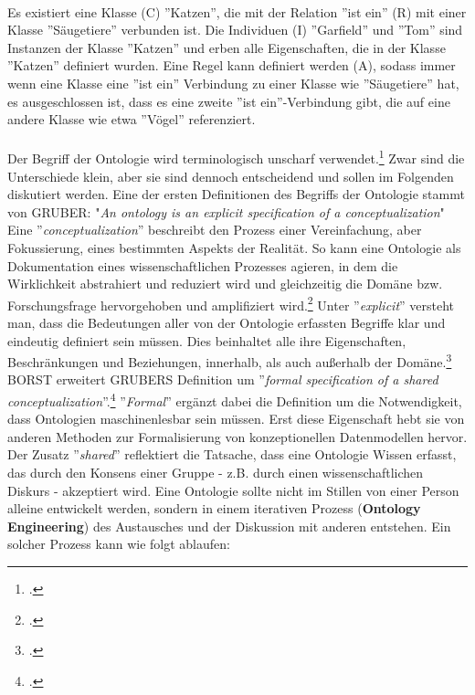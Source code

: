 \documentclass[12pt,a4paper]{article}
\begin{document}
\\
Es existiert eine Klasse (C) ''Katzen'', die mit der Relation ''ist ein'' (R) mit einer Klasse ''Säugetiere'' verbunden ist.  Die Individuen (I) ''Garfield'' und ''Tom'' sind Instanzen der Klasse ''Katzen'' und erben alle Eigenschaften, die in der Klasse ''Katzen'' definiert wurden. Eine Regel kann definiert werden (A), sodass immer wenn eine Klasse eine ''ist ein'' Verbindung zu einer Klasse wie ''Säugetiere'' hat, es ausgeschlossen ist, dass es eine zweite ''ist ein''-Verbindung  gibt, die auf eine andere Klasse wie etwa ''Vögel'' referenziert. 
\\
\\
Der Begriff der Ontologie wird terminologisch unscharf verwendet.\footcite[][S.1]{gruber1993translation} Zwar sind die Unterschiede klein, aber sie sind dennoch entscheidend und sollen im Folgenden diskutiert werden.
Eine der ersten Definitionen des Begriffs der Ontologie stammt von GRUBER: "\textit{An ontology is an explicit specification of a conceptualization}"
\\
Eine ''\textit{conceptualization}'' beschreibt den Prozess einer Vereinfachung, aber Fokussierung, eines bestimmten Aspekts der Realität. So kann eine Ontologie als Dokumentation eines wissenschaftlichen 
Prozesses agieren, in dem die Wirklichkeit abstrahiert und reduziert wird und gleichzeitig die Domäne bzw. Forschungsfrage hervorgehoben und amplifiziert wird.\footcite[][]{thaller2017ungefahre}
Unter ''\textit{explicit}'' versteht man, dass die Bedeutungen aller von der Ontologie erfassten Begriffe klar und eindeutig definiert sein müssen. Dies beinhaltet alle ihre Eigenschaften, Beschränkungen und Beziehungen, innerhalb, als auch außerhalb der Domäne.\footcite{sure2003methodology}
BORST erweitert GRUBERS Definition um  ''\textit{formal specification of a shared  conceptualization}''.\footcite{borst1997construction}
''\textit{Formal}'' ergänzt dabei die Definition um die Notwendigkeit, dass Ontologien maschinenlesbar sein müssen. Erst diese Eigenschaft hebt sie von anderen Methoden zur Formalisierung von konzeptionellen Datenmodellen hervor. Der Zusatz ''\textit{shared}'' reflektiert die Tatsache, dass eine Ontologie Wissen erfasst, das durch den Konsens einer Gruppe - z.B. durch einen wissenschaftlichen Diskurs - akzeptiert wird. Eine Ontologie sollte nicht im Stillen von einer Person alleine entwickelt werden, sondern in einem iterativen Prozess (\textbf{Ontology Engineering}) des Austausches und der Diskussion mit anderen entstehen. Ein solcher Prozess kann wie folgt ablaufen:
\end{document}
